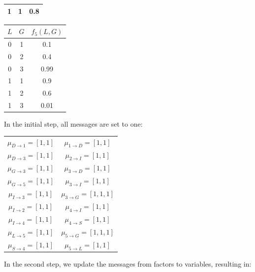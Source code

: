 \begin{example}
\begin{table}[H]
\begin{tabular}{cc|c|}
        \multicolumn{1}{|c}{1} & 1   & 0.8        \\ \hline
        \end{tabular}
    \end{table}
    \begin{table}[H]
        \centering
        \begin{tabular}{cc|c|}
        \cline{3-3}
        $L$                    & $G$ & $f_5(L,G)$ \\ \hline
        \multicolumn{1}{|c}{0} & 1   & 0.1        \\
        \multicolumn{1}{|c}{0} & 2   & 0.4        \\
        \multicolumn{1}{|c}{0} & 3   & 0.99       \\
        \multicolumn{1}{|c}{1} & 1   & 0.9        \\
        \multicolumn{1}{|c}{1} & 2   & 0.6        \\
        \multicolumn{1}{|c}{1} & 3   & 0.01       \\ \hline
        \end{tabular}
    \end{table}
    In the initial step, all messages are set to one:
    \begin{table}[H]
        \centering
        \begin{tabular}{cc}
        \hline
        $\mu_{D \rightarrow 1}=[1,1]$ & $\mu_{1 \rightarrow D}=[1,1]$   \\
        $\mu_{D \rightarrow 3}=[1,1]$ & $\mu_{2 \rightarrow I}=[1,1]$   \\
        $\mu_{G \rightarrow 3}=[1,1]$ & $\mu_{3 \rightarrow D}=[1,1]$   \\
        $\mu_{G \rightarrow 5}=[1,1]$ & $\mu_{3 \rightarrow I}=[1,1]$   \\
        $\mu_{I \rightarrow 3}=[1,1]$ & $\mu_{3 \rightarrow G}=[1,1,1]$ \\
        $\mu_{I \rightarrow 2}=[1,1]$ & $\mu_{4 \rightarrow I}=[1,1]$   \\
        $\mu_{I \rightarrow 4}=[1,1]$ & $\mu_{4 \rightarrow S}=[1,1]$   \\
        $\mu_{L \rightarrow 5}=[1,1]$ & $\mu_{5 \rightarrow G}=[1,1,1]$ \\
        $\mu_{S \rightarrow 4}=[1,1]$ & $\mu_{5 \rightarrow L}=[1,1]$   \\ \hline
        \end{tabular}
    \end{table}
    In the second step, we update the messages from factors to variables, resulting in:

\end{example}
